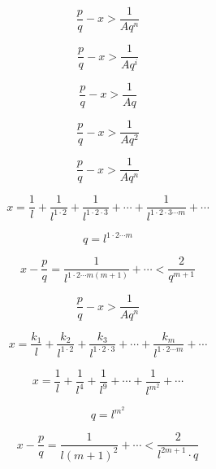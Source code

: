 \documentclass{article}
\begin{document}
\begin{equation}
  \frac{p}{q} - x > \frac{1}{Aq^n}
\end{equation}

\begin{equation}
  \frac{p}{q} - x > \frac{1}{Aq^i}
\end{equation}

\begin{equation}
  \frac{p}{q} - x > \frac{1}{Aq}
\end{equation}

\begin{equation}
  \frac{p}{q} - x > \frac{1}{Aq^2}
\end{equation}

\begin{equation}
  \frac{p}{q} - x > \frac{1}{Aq^n}
\end{equation}

\begin{equation}
  x = \frac{1}{l} + \frac{1}{l^{1 \cdot 2}} + \frac{1}{l^{1\cdot 2\cdot 3}}
  + \cdots + \frac{1}{l^{1\cdot 2\cdot 3\cdots m}} + \cdots
\end{equation}

\begin{equation}
  q = l^{1\cdot 2\cdots m}
\end{equation}

\begin{equation}
  x - \frac{p}{q} = \frac{1}{l^{1\cdot 2\cdots m(m + 1)}} + \cdots
  < \frac{2}{q^{m+1}}
\end{equation}

\begin{equation}
  \frac{p}{q} - x > \frac{1}{Aq^n}
\end{equation}

\begin{equation}
  x = \frac{k_1}{l} + \frac{k_2}{l^{1\cdot 2}} + \frac{k_3}{l^{1\cdot 2\cdot 3}}
  + \cdots + \frac{k_m}{l^{1\cdot 2\cdots m}} + \cdots
\end{equation}

\begin{equation}
  x = \frac{1}{l} + \frac{1}{l^4} + \frac{1}{l^9} + \cdots + \frac{1}{l^{m^2}}
  + \cdots
\end{equation}

\begin{equation}
  q = l^{m^2}
\end{equation}

\begin{equation}
  x - \frac{p}{q} = \frac{1}{l{(m + 1)}^2} + \cdots < \frac{2}{l^{2m+1}\cdot q}
\end{equation}
\end{document}

